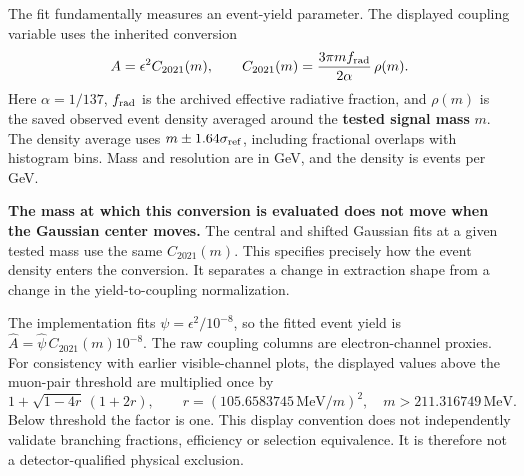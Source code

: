 \documentclass[11pt]{article}
\newcommand{\Ah}{\widehat A}\newcommand{\sh}{\widehat\sigma}
\begin{document}
The fit fundamentally measures an event-yield parameter. The displayed coupling variable uses the inherited conversion
\[
 A=\epsilon^2 C_{2021}(m),\qquad
 C_{2021}(m)=\frac{3\pi m f_{\rm rad}}{2\alpha}\,\rho(m).
\]
Here $\alpha=1/137$, $f_{\rm rad}$ is the archived effective radiative fraction, and $\rho(m)$ is the saved observed event density averaged around the \textbf{tested signal mass} $m$. The density average uses $m\pm1.64\sigma_{\rm ref}$, including fractional overlaps with histogram bins. Mass and resolution are in GeV, and the density is events per GeV.

\textbf{The mass at which this conversion is evaluated does not move when the Gaussian center moves.} The central and shifted Gaussian fits at a given tested mass use the same $C_{2021}(m)$. This specifies precisely how the event density enters the conversion. It separates a change in extraction shape from a change in the yield-to-coupling normalization.

The implementation fits $\psi=\epsilon^2/10^{-8}$, so the fitted event yield is $\Ah=\widehat\psi\,C_{2021}(m)10^{-8}$. The raw coupling columns are electron-channel proxies. For consistency with earlier visible-channel plots, the displayed values above the muon-pair threshold are multiplied once by
\[
 1+\sqrt{1-4r}\,(1+2r),\qquad
 r=(105.6583745\,\mathrm{MeV}/m)^2,
 \quad m>211.316749\,\mathrm{MeV}.
\]
Below threshold the factor is one. This display convention does not independently validate branching fractions, efficiency or selection equivalence. It is therefore not a detector-qualified physical exclusion.
\end{document}

